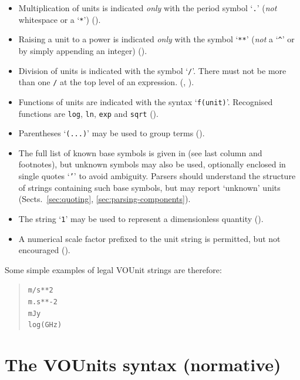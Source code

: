 \documentclass[11pt,a4paper]{ivoa}
\newcommand{\unit}[1]{\texttt{\small\color{orange}#1}}
\newcommand{\unitstyle}{\small\color{orange}}
\begin{document}
\begin{itemize}
\item Multiplication of units is indicated {\em only\/}
      with the period symbol `\unit{.}'
      ({\em not\/} whitespace or a `{\unitstyle\verb|*|}')
      ().
\item Raising a unit to a power is indicated {\em only\/} with the symbol
      `{\unitstyle\verb|**|}'
      ({\em not\/} a `{\unitstyle\verb|^|}'
      or by simply appending an integer)
      ().
\item Division of units is indicated with the symbol `\unit{/}'.
      There must not be more than one \unit{/}
      at the top level of an expression.
      (, ).
\item Functions of units are indicated with the syntax `\unit{f(unit)}'.
      Recognised functions are
      \unit{log}, \unit{ln}, \unit{exp} and \unit{sqrt}
      ().
\item Parentheses `\unit{(...)}' may be used to group terms
      ().
\item The full list of known base symbols is given in
       (see last column and footnotes),
      but unknown symbols may also be used,
      optionally enclosed in single quotes `\unit{'}' to avoid ambiguity.
      Parsers should understand the structure of strings containing
      such base symbols, but may report `unknown' units
      (Sects.\ \ref{sec:quoting}, \ref{sec:parsing-components}).
\item The string `\unit{1}' may be used to represent a dimensionless quantity
      ().
\item A numerical scale factor prefixed to the unit string is permitted,
      but not encouraged
      ().
\end{itemize}
Some simple examples of legal VOUnit strings are therefore:
\begin{quote}
  \unit{m/s**2} \\
  \unit{m.s**-2} \\
  \unit{mJy} \\
  \unit{log(GHz)} \\
\end{quote}

\section{The VOUnits syntax (normative)\label{sec:proposal}}
\end{document}
